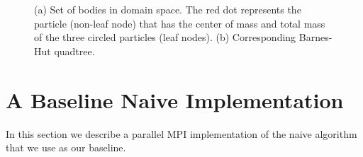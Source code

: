 \documentclass[letterpaper]{article}
\begin{document}
\begin{figure}[h]\centering
  \hspace{1pt} 
  \caption{(a) Set of bodies in  domain space. The red dot represents the particle (non-leaf node) that has the center of mass and total mass of the three circled particles (leaf nodes). (b) Corresponding Barnes-Hut quadtree.\label{domain}}
\end{figure}

\section{A Baseline Naive Implementation}\label{sec:yourmethod}
In this section we describe a parallel MPI \cite{mpi} implementation of the naive algorithm that we use as our baseline.
\end{document}
